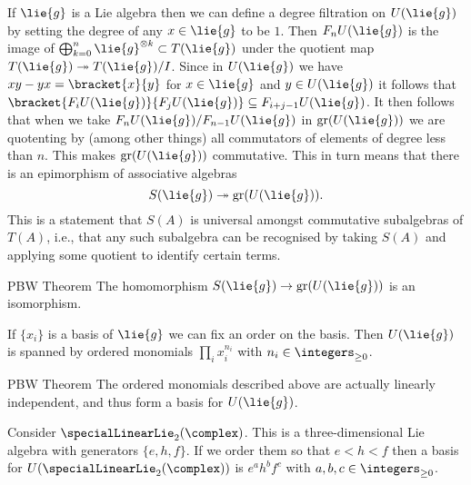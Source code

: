 \documentclass[fleqn]{NotesClass}
\DeclareMathOperator{\gr}{gr}
\begin{document}
    If \(\lie{g}\) is a Lie algebra then we can define a degree filtration on \(U(\lie{g})\) by setting the degree of any \(x \in \lie{g}\) to be \(1\).
    Then \(F_nU(\lie{g})\) is the image of \(\bigoplus_{k=0}^n \lie{g}^{\otimes k} \subset T(\lie{g})\) under the quotient map \(T(\lie{g}) \twoheadrightarrow T(\lie{g})/I\).
    Since in \(U(\lie{g})\) we have \(xy - yx = \bracket{x}{y}\) for \(x \in \lie{g}\) and \(y \in U(\lie{g})\) it follows that \(\bracket{F_iU(\lie{g})}{F_jU(\lie{g})} \subseteq F_{i + j - 1}U(\lie{g})\).
    It then follows that when we take \(F_nU(\lie{g}) / F_{n-1}U(\lie{g})\) in \(\gr(U(\lie{g}))\) we are quotenting by (among other things) all commutators of elements of degree less than \(n\).
    This makes \(\gr(U(\lie{g}))\) commutative.
    This in turn means that there is an epimorphism of associative algebras
    \begin{equation}
        S(\lie{g}) \twoheadrightarrow \gr(U(\lie{g})).
    \end{equation}
    This is a statement that \(S(A)\) is universal amongst commutative subalgebras of \(T(A)\), i.e., that any such subalgebra can be recognised by taking \(S(A)\) and applying some quotient to identify certain terms.
    
    \begin{dfn}{PBW Theorem}{}
        The homomorphism \(S(\lie{g}) \to \gr(U(\lie{g}))\) is an isomorphism.
    \end{dfn}
    
    \begin{crl}{}{}
        If \(\{x_i\}\) is a basis of \(\lie{g}\) we can fix an order on the basis.
        Then \(U(\lie{g})\) is spanned by ordered monomials \(\prod_i x_i^{n_i}\) with \(n_i \in \integers_{\ge 0}\).
    \end{crl}
    
    \begin{thm}{PBW Theorem}{}
        The ordered monomials described above are actually linearly independent, and thus form a basis for \(U(\lie{g})\).
    \end{thm}
    
    \begin{exm}{}{}
        Consider \(\specialLinearLie_2(\complex)\).
        This is a three-dimensional Lie algebra with generators \(\{e, h, f\}\).
        If we order them so that \(e < h < f\) then a basis for \(U(\specialLinearLie_2(\complex))\) is \(e^a h^b f^c\) with \(a, b, c \in \integers_{\ge 0}\).
    \end{exm}
    
\end{document}

